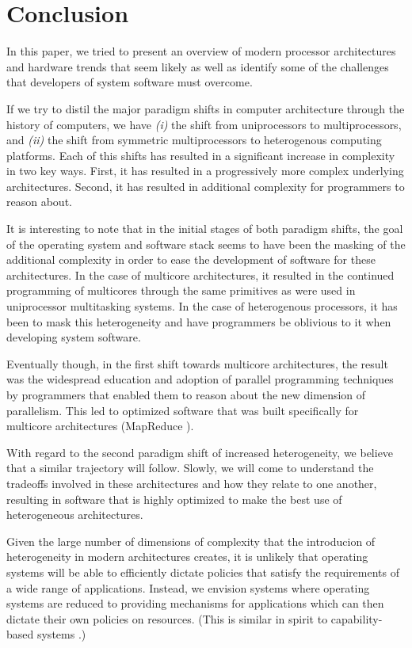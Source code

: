 \section{Conclusion}

In this paper, we tried to present an overview of modern processor architectures and hardware trends that seem likely as well as identify some of the challenges that developers of system software must overcome.

If we try to distil the major paradigm shifts in computer architecture through the history of computers, we have \emph{(i)} the shift from uniprocessors to multiprocessors, and \emph{(ii)} the shift from symmetric multiprocessors to heterogenous computing platforms. Each of this shifts has resulted in a significant increase in complexity in two key ways. First, it has resulted in a progressively more complex underlying architectures. Second, it has resulted in additional complexity for programmers to reason about.

It is interesting to note that in the initial stages of both paradigm shifts, the goal of the operating system and software stack seems to have been the masking of the additional complexity in order to ease the development of software for these architectures. In the case of multicore architectures, it resulted in the continued programming of multicores through the same primitives as were used in uniprocessor multitasking systems. In the case of heterogenous processors, it has been to mask this heterogeneity and have programmers be oblivious to it when developing system software.

Eventually though, in the first shift towards multicore architectures, the result was the widespread education and adoption of parallel programming techniques by programmers that enabled them to reason about the new dimension of parallelism. This led to optimized software that was built specifically for multicore architectures (\eg MapReduce \cite{mapreduce}).

With regard to the second paradigm shift of increased heterogeneity, we believe that a similar trajectory will follow. Slowly, we will come to understand the tradeoffs involved in these architectures and how they relate to one another, resulting in software that is highly optimized to make the best use of heterogeneous architectures.

Given the large number of dimensions of complexity that the introducion of heterogeneity in modern architectures creates, it is unlikely that operating systems will be able to efficiently dictate policies that satisfy the requirements of a wide range of applications. Instead, we envision systems where operating systems are reduced to providing mechanisms for applications which can then dictate their own policies on resources. (This is similar in spirit to capability-based systems \cite{capabilities}.)